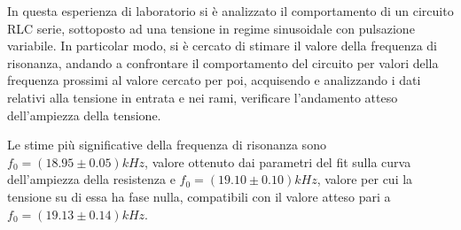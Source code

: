 In questa esperienza di laboratorio si è analizzato il comportamento di un circuito RLC serie, sottoposto ad una tensione
in regime sinusoidale con pulsazione variabile.
In particolar modo, si è cercato di stimare il valore della frequenza di risonanza, andando a confrontare il comportamento
del circuito per valori della frequenza prossimi
al valore cercato per poi, acquisendo e analizzando i dati relativi alla tensione in entrata e nei rami, verificare
l’andamento atteso dell’ampiezza della tensione.

Le stime più significative della frequenza di risonanza sono $f_0 = (18.95 \pm 0.05) kHz$, valore ottenuto dai parametri
del fit sulla curva dell’ampiezza della resistenza e $f_0 = (19.10 \pm 0.10)kHz$, valore per cui la tensione su di essa
ha fase nulla, compatibili con il valore atteso pari a $f_0 = (19.13 \pm 0.14) kHz$.


